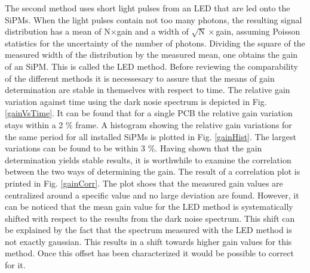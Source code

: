 The second method uses short light pulses from an LED that are led onto the SiPMs. When the light pulses contain not too many photons, the resulting signal distribution has a mean of N$\times$gain and a width of $\sqrt{\text{N}}\times$gain, assuming Poisson statistics for the uncertainty of the number of photons. Dividing the square of the measured width of the distribution by the measured mean, one obtains the gain of an SiPM. This is called the LED method.
Before reviewing the comparability of the different methods it is necessesary to assure that the means of gain determination are stable in themselves with respect to time. The relative gain variation against time using the dark nosie spectrum is depicted in Fig. \ref{gainVsTime}. It can be found that for a single PCB the relative gain variation stays within a 2 \% frame. A histogram showing the relative gain variations for the same period for all installed SiPMs is plotted in Fig. \ref{gainHist}. The largest variations can be found to be within 3 \%. Having shown that the gain determination yields stable results, it is worthwhile to examine the correlation between the two ways of determining the gain. The result of a correlation plot is printed in Fig. \ref{gainCorr}. The plot shoes that the measured gain values are centralized around a specific value and no large deviation are found. However, it can be noticed that the mean gain value for the LED method is systematically shifted with respect to the results from the dark noise spectrum. This shift can be explained by the fact that the spectrum measured with the LED method is not exactly gaussian. This results in a shift towards higher gain values for this method. Once this offset has been characterized it would be possible to correct for it.

